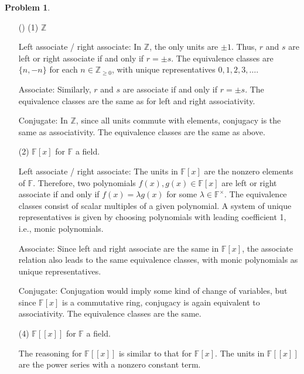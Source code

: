 \documentclass[12pt]{article}
\theoremstyle{definition}
\newtheorem{problem}{Problem}
\newcounter{subq}[problem]
\newenvironment{subproblem}
{\refstepcounter{subq} \begin{itemize} \item[(\alph{subq})]}
{\end{itemize} \medskip}
\begin{document}
\begin{problem}
\begin{subproblem}
        (1) $\mathbb{Z}$
        \begin{solution}

            Left associate / right associate: In \( \mathbb{Z} \), the only units are \( \pm 1 \). Thus, \( r \) and \( s \) are left or right associate if and only if \( r = \pm s \). The equivalence classes are \( \{n, -n\} \) for each \( n \in \mathbb{Z}_{\geq 0} \), with unique representatives \( 0, 1, 2, 3, \dots \).
        
            Associate: Similarly, \( r \) and \( s \) are associate if and only if \( r = \pm s \). The equivalence classes are the same as for left and right associativity.
            
            Conjugate: In \( \mathbb{Z} \), since all units commute with elements, conjugacy is the same as associativity. The equivalence classes are the same as above.\\    
        \end{solution}

        (2) $\mathbb{F}[x]$ for $\mathbb{F}$ a field.
        \begin{solution}

            Left associate / right associate: The units in \( \mathbb{F}[x] \) are the nonzero elements of \( \mathbb{F} \). Therefore, two polynomials \( f(x), g(x) \in \mathbb{F}[x] \) are left or right associate if and only if \( f(x) = \lambda g(x) \) for some \( \lambda \in \mathbb{F}^\times \). The equivalence classes consist of scalar multiples of a given polynomial. A system of unique representatives is given by choosing polynomials with leading coefficient 1, i.e., monic polynomials.
        
            Associate: Since left and right associate are the same in \( \mathbb{F}[x] \), the associate relation also leads to the same equivalence classes, with monic polynomials as unique representatives.
            
            Conjugate: Conjugation would imply some kind of change of variables, but since \( \mathbb{F}[x] \) is a commutative ring, conjugacy is again equivalent to associativity. The equivalence classes are the same.\\    
        \end{solution}

        (4) $\mathbb{F}[[x]]$ for $\mathbb{F}$ a field.
        \begin{solution}

            The reasoning for \( \mathbb{F}[[x]] \) is similar to that for \( \mathbb{F}[x] \). The units in \( \mathbb{F}[[x]] \) are the power series with a nonzero constant term.
        

\end{solution}
\end{subproblem}
\end{problem}
\end{document}
